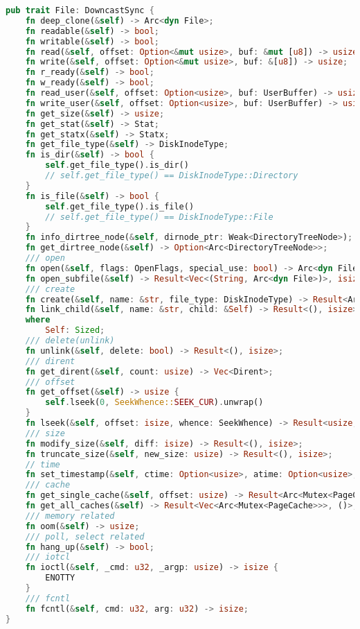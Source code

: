 \begin{lstlisting}[language={Rust}, caption={File trait}]
pub trait File: DowncastSync {
    fn deep_clone(&self) -> Arc<dyn File>;
    fn readable(&self) -> bool;
    fn writable(&self) -> bool;
    fn read(&self, offset: Option<&mut usize>, buf: &mut [u8]) -> usize;
    fn write(&self, offset: Option<&mut usize>, buf: &[u8]) -> usize;
    fn r_ready(&self) -> bool;
    fn w_ready(&self) -> bool;
    fn read_user(&self, offset: Option<usize>, buf: UserBuffer) -> usize;
    fn write_user(&self, offset: Option<usize>, buf: UserBuffer) -> usize;
    fn get_size(&self) -> usize;
    fn get_stat(&self) -> Stat;
    fn get_statx(&self) -> Statx;
    fn get_file_type(&self) -> DiskInodeType;
    fn is_dir(&self) -> bool {
        self.get_file_type().is_dir()
        // self.get_file_type() == DiskInodeType::Directory
    }
    fn is_file(&self) -> bool {
        self.get_file_type().is_file()
        // self.get_file_type() == DiskInodeType::File
    }
    fn info_dirtree_node(&self, dirnode_ptr: Weak<DirectoryTreeNode>);
    fn get_dirtree_node(&self) -> Option<Arc<DirectoryTreeNode>>;
    /// open
    fn open(&self, flags: OpenFlags, special_use: bool) -> Arc<dyn File>;
    fn open_subfile(&self) -> Result<Vec<(String, Arc<dyn File>)>, isize>;
    /// create
    fn create(&self, name: &str, file_type: DiskInodeType) -> Result<Arc<dyn File>, isize>;
    fn link_child(&self, name: &str, child: &Self) -> Result<(), isize>
    where
        Self: Sized;
    /// delete(unlink)
    fn unlink(&self, delete: bool) -> Result<(), isize>;
    /// dirent
    fn get_dirent(&self, count: usize) -> Vec<Dirent>;
    /// offset
    fn get_offset(&self) -> usize {
        self.lseek(0, SeekWhence::SEEK_CUR).unwrap()
    }
    fn lseek(&self, offset: isize, whence: SeekWhence) -> Result<usize, isize>;
    /// size
    fn modify_size(&self, diff: isize) -> Result<(), isize>;
    fn truncate_size(&self, new_size: usize) -> Result<(), isize>;
    // time
    fn set_timestamp(&self, ctime: Option<usize>, atime: Option<usize>, mtime: Option<usize>);
    /// cache
    fn get_single_cache(&self, offset: usize) -> Result<Arc<Mutex<PageCache>>, ()>;
    fn get_all_caches(&self) -> Result<Vec<Arc<Mutex<PageCache>>>, ()>;
    /// memory related
    fn oom(&self) -> usize;
    /// poll, select related
    fn hang_up(&self) -> bool;
    /// iotcl
    fn ioctl(&self, _cmd: u32, _argp: usize) -> isize {
        ENOTTY
    }
    /// fcntl
    fn fcntl(&self, cmd: u32, arg: u32) -> isize;
}
\end{lstlisting}

